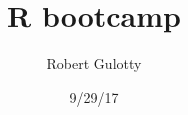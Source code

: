 \documentclass[11pt]{article}
\begin{document}
\title{R bootcamp}
\author{Robert Gulotty}
\date{9/29/17}
\maketitle
\end{document}
